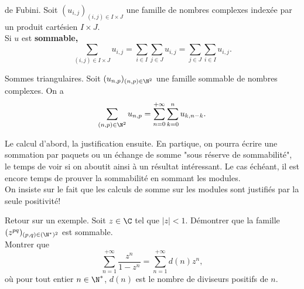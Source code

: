 \documentclass[11pt]{article}
\begin{document}
\begin{thm}{de Fubini.}{}
    Soit $(u_{i,j})_{(i,j)\in I\times J}$ une famille de nombres complexes indexée par un produit cartésien $I\times J$.\\
    Si $u$ est \bf{sommable},
    \begin{equation*}
        \sum_{(i,j)\in I\times J} u_{i,j}=\sum_{i\in I}\sum_{j\in J}u_{i,j}=\sum_{j\in J}\sum_{i\in I}u_{i,j}.
    \end{equation*}
\end{thm}

\begin{ex}{Sommes triangulaires.}{}
    Soit $(u_{n,p})_{(n,p)\in\N^2}$ une famille sommable de nombres complexes. On a
    \begin{equation*}
        \sum_{(n,p)\in\N^2}u_{n,p}=\sum_{n=0}^{+\infty}\sum_{k=0}^nu_{k,n-k}.
    \end{equation*}
\end{ex}

\begin{meth}{Le calcul d'abord, la justification ensuite.}{}
    En partique, on pourra écrire une sommation par paquets ou un échange de somme "sous réserve de sommabilité", le temps de voir si on aboutit ainsi à un résultat intéressant.\n
    Le cas échéant, il est encore temps de prouver la sommabilité en sommant les modules.\\
    On insiste sur le fait que les calculs de somme sur les modules sont justifiés par la seule positivité!
\end{meth}

\begin{ex}{Retour sur un exemple.}{}
    Soit $z\in\C$ tel que $|z|<1$. Démontrer que la famille $(z^{pq})_{(p,q)\in(\N^*)^2}$ est sommable.\\
    Montrer que
    \begin{equation*}
        \sum_{n=1}^{+\infty}\frac{z^n}{1-z^n}=\sum_{n=1}^{+\infty}d(n)z^n,
    \end{equation*}
    où pour tout entier $n\in\N^*$, $d(n)$ est le nombre de diviseurs positifs de $n$.
\end{ex}
\end{document}
